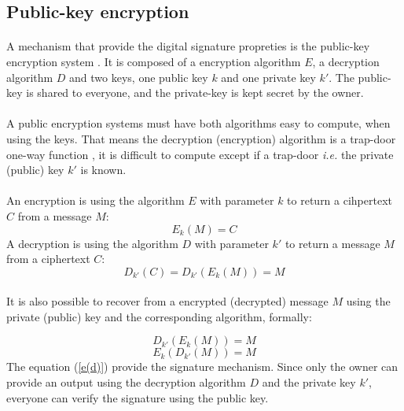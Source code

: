 \documentclass[letterpaper]{article}
\begin{document}
\subsection{Public-key encryption}

\paragraph{}
A mechanism that provide the digital signature propreties is the public-key
encryption system \cite{RSA}. It is composed of a encryption algorithm $E$, a
decryption algorithm $D$ and two keys, one public key $k$ and one private key
$k'$. The public-key is shared to everyone, and the private-key is
kept secret by the owner.

\paragraph{}
A public encryption systems must have both algorithms
easy to compute, when using the keys. That means the decryption (encryption)
algorithm is a trap-door one-way function \cite{DiffieHellman}, it
is difficult to compute except if a trap-door \textit{i.e.}
the private (public) key $k'$ is known.
\paragraph{}

An encryption is using the algorithm $E$ with parameter $k$
to return a cihpertext $C$ from a message $M$:
\begin{equation}
    E_k(M) = C
\end{equation}
A decryption is using the algorithm $D$ with parameter $k'$
to return a message $M$ from a ciphertext $C$:
\begin{equation}
    D_{k'}(C) = D_{k'}(E_k(M)) =  M
\end{equation}

\paragraph{}
It is also possible to recover from a encrypted
(decrypted) message $M$ using the private (public) key and the
corresponding algorithm, formally:

\begin{equation}
    D_{k'}(E_k(M)) = M
\end{equation}
\begin{equation}
    \label{e(d)}
    E_{k}(D_{k'}(M)) = M
\end{equation}
The equation (\ref{e(d)}) provide the signature mechanism. Since only
the owner can provide an output using the decryption algorithm $D$ and
the private key $k'$, everyone can verify the signature using the public key.
\end{document}

